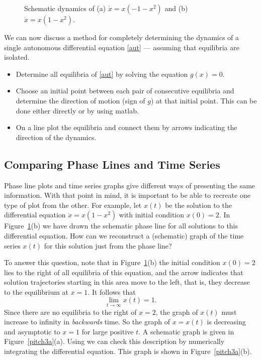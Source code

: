 \documentclass{ximera}
\begin{document}
\begin{figure}[htb]
       \centerline{%
	}
\caption{Schematic dynamics of (a) $\dot{x}=x(-1-x^2)$ and (b) $\dot{x}=x(1-x^2)$.}
\label{pitch3}
\end{figure}

We can now discuss a method for completely determining the
dynamics of a single autonomous differential equation \eqref{aut}
--- assuming that equilibria are isolated.

\begin{itemize}
\item Determine all equilibria of \eqref{aut} by solving the
equation $g(x)=0$.
\item Choose an initial point between each pair of consecutive
equilibria and determine the direction of motion (sign of $g$) at
that initial point. This can be done either directly or by using
{\sf matlab}.
\item On a line plot the equilibria  and
connect them by arrows indicating the direction of the dynamics.
\end{itemize}




\subsection*{Comparing Phase Lines and Time Series}

Phase line plots and time series graphs give different ways of
presenting the same information.  With that point in mind, it is
important to be able to recreate one type of plot from
the other.  For example, let $x(t)$ be the solution to the
differential equation $\dot{x}=x(1-x^2)$ with initial condition $x(0)=2$.
In Figure~\ref{pitch3}(b) we have drawn the schematic phase line for
all solutions to this differential equation. How can we reconstruct
a (schematic) graph of the time series $x(t)$ for this solution just
from the phase line?

To answer this question, note that in Figure~\ref{pitch3}(b) the
initial condition $x(0)=2$ lies to the right of all equilibria of
this equation, and the arrow indicates that solution trajectories
starting in this area move to the left, that is, they decrease to
the equilibrium at $x=1$.  It follows that
\[
\lim_{t\to\infty} x(t) = 1.
\]
Since there are no equilibria to the right of $x=2$, the graph of $x(t)$
must increase to infinity in {\em backwards\/} time.  So the graph of 
$x=x(t)$ is decreasing and asymptotic to $x=1$ for large positive $t$.  
A schematic graph is given in Figure~\ref{pitch3a}(a).  Using {\dfield} 
we can check this description by numerically integrating the differential
equation.   This graph is shown in Figure~\ref{pitch3a}(b).
\end{document}
